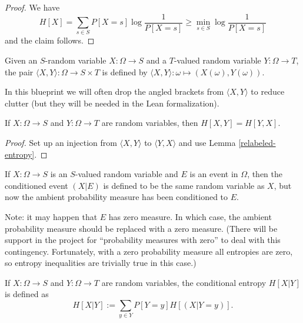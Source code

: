\begin{proof}  We have
$$ H[X] = \sum_{s \in S} P[X=s] \log \frac{1}{P[X=s]} \geq \min_{s \in S} \log \frac{1}{P[X=s]}$$
and the claim follows.
\end{proof}

\begin{definition}\label{pair-def}
  \leanok
Given an $S$-random variable $X: \Omega \to S$ and a $T$-valued random variable $Y: \Omega \to T$, the pair $\langle X,Y \rangle: \Omega \to S \times T$ is defined by $\langle X, Y \rangle: \omega \mapsto (X(\omega), Y(\omega))$.
\end{definition}

In this blueprint we will often drop the angled brackets from $\langle X, Y \rangle$ to reduce clutter (but they will be needed in the Lean formalization).

\begin{lemma}\label{joint-symm}   If $X: \Omega \to S$ and $Y: \Omega \to T$ are random variables, then $H[X,Y ] = H[ Y,X]$.\end{lemma}

\begin{proof} Set up an injection from $\langle X,Y\rangle$ to $\langle Y,X\rangle$ and use Lemma \ref{relabeled-entropy}.
\end{proof}


\begin{definition}\label{condition-event-def}  If $X: \Omega \to S$ is an $S$-valued random variable and $E$ is an event in $\Omega$, then the conditioned event $(X|E)$ is defined to be the same random variable as $X$, but now the ambient probability measure has been conditioned to $E$.
\end{definition}

Note: it may happen that $E$ has zero measure.  In which case, the ambient probability measure should be replaced with a zero measure.  (There will be support in the project for ``probability measures with zero'' to deal with this contingency.  Fortunately, with a zero probability measure all entropies are zero, so entropy inequalities are trivially true in this case.)

\begin{definition}\label{conditional-entropy-def}
    If $X: \Omega \to S$ and $Y: \Omega \to T$ are random variables, the conditional entropy $H[X|Y]$ is defined as
  $$ H[X|Y] := \sum_{y \in Y} P[Y = y] H[(X | Y=y)].$$
\end{definition}

